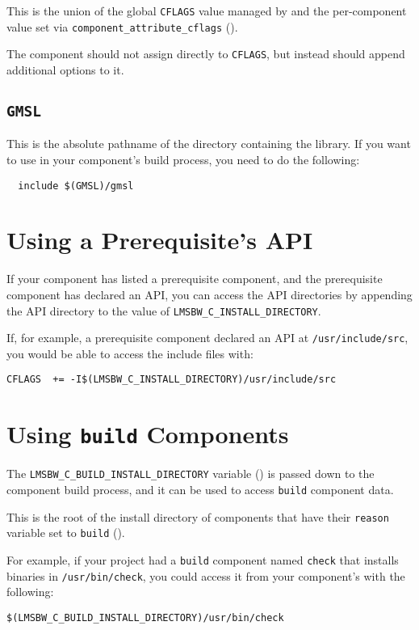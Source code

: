 This is the union of the global \texttt{CFLAGS} value managed by
\lmsbw and the per-component value set via
\texttt{\texttt{component\_attribute\_cflags}} ().

The component \makefile should not assign directly to \texttt{CFLAGS},
but instead should append additional options to it.

\subsection{\texttt{GMSL}}

This is the absolute pathname of the directory containing the \gmsl
library.  If you want to use \gmsl in your component's build process,
you need to do the following:

\begin{verbatim}
  include $(GMSL)/gmsl
\end{verbatim}

\section{Using a Prerequisite's API}\label{wrap:using-prerequisite-api}

If your component has listed a prerequisite component, and the
prerequisite component has declared an API, you can access the API
directories by appending the API directory to the value of
\texttt{LMSBW\_C\_INSTALL\_DIRECTORY}.

If, for example, a prerequisite component declared an API at
\texttt{/usr/include/src}, you would be able to access the
include files with:

\begin{verbatim}
CFLAGS  += -I$(LMSBW_C_INSTALL_DIRECTORY)/usr/include/src
\end{verbatim}

\section{Using \texttt{build} Components}\label{wrap:using-build-components}

The \texttt{LMSBW\_C\_BUILD\_INSTALL\_DIRECTORY} variable
() is passed down to the component
build process, and it can be used to access \texttt{build} component
data.

This is the root of the install directory of components that have
their \texttt{reason} variable set to \texttt{build}
().

For example, if your project had a \texttt{build} component named
\texttt{check} that installs binaries in \texttt{/usr/bin/check}, you
could access it from your component's \makefile with the following:

\begin{verbatim}
$(LMSBW_C_BUILD_INSTALL_DIRECTORY)/usr/bin/check
\end{verbatim}
